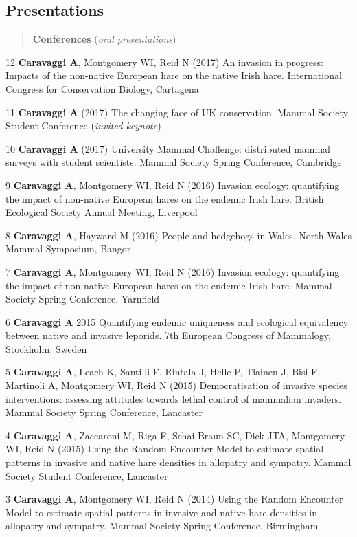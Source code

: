 \documentclass[]{article}
\begin{document}
\subsection{Presentations}\label{presentations}

\begin{quote}
\textbf{Conferences} (\emph{oral presentations})
\end{quote}

12 \textbf{Caravaggi A}, Montgomery WI, Reid N (2017) An invasion in
progress: Impacts of the non-native European hare on the native Irish
hare. International Congress for Conservation Biology, Cartagena

11 \textbf{Caravaggi A} (2017) The changing face of UK conservation.
Mammal Society Student Conference (\emph{invited keynote})

10 \textbf{Caravaggi A} (2017) University Mammal Challenge: distributed
mammal surveys with student scientists. Mammal Society Spring
Conference, Cambridge

9 \textbf{Caravaggi A}, Montgomery WI, Reid N (2016) Invasion ecology:
quantifying the impact of non-native European hares on the endemic Irish
hare. British Ecological Society Annual Meeting, Liverpool

8 \textbf{Caravaggi A}, Hayward M (2016) People and hedgehogs in Wales.
North Wales Mammal Symposium, Bangor

7 \textbf{Caravaggi A}, Montgomery WI, Reid N (2016) Invasion ecology:
quantifying the impact of non-native European hares on the endemic Irish
hare. Mammal Society Spring Conference, Yarnfield

6 \textbf{Caravaggi A} 2015 Quantifying endemic uniqueness and
ecological equivalency between native and invasive leporids. 7th
European Congress of Mammalogy, Stockholm, Sweden

5 \textbf{Caravaggi A}, Leach K, Santilli F, Rintala J, Helle P, Tiainen
J, Bisi F, Martinoli A, Montgomery WI, Reid N (2015) Democratisation of
invasive species interventions: assessing attitudes towards lethal
control of mammalian invaders. Mammal Society Spring Conference,
Lancaster

4 \textbf{Caravaggi A}, Zaccaroni M, Riga F, Schai-Braun SC, Dick JTA,
Montgomery WI, Reid N (2015) Using the Random Encounter Model to
estimate spatial patterns in invasive and native hare densities in
allopatry and sympatry. Mammal Society Student Conference, Lancaster

3 \textbf{Caravaggi A}, Montgomery WI, Reid N (2014) Using the Random
Encounter Model to estimate spatial patterns in invasive and native hare
densities in allopatry and sympatry. Mammal Society Spring Conference,
Birmingham
\end{document}
